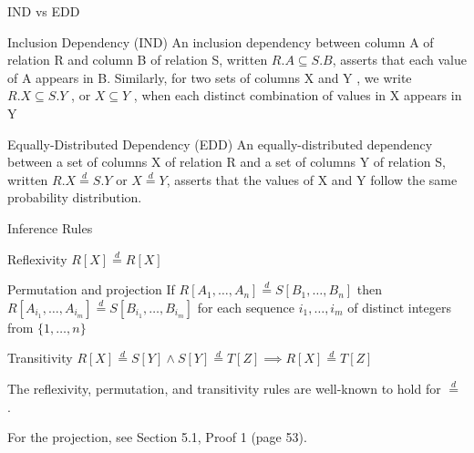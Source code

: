 \documentclass[10pt,notes]{beamer}
\newcommand{\eqdist}{\stackrel{d}{=}}
\begin{document}
\begin{frame}{IND vs EDD}
    \begin{block}{Inclusion Dependency (IND)}
        \smallskip
        An inclusion dependency between column A of relation
        R and column B of relation S, written $R.A \subseteq S.B$, asserts that each
        value of A appears in B. Similarly, for two sets of columns X
        and Y , we write $R.X \subseteq S.Y$ , or $X \subseteq Y$ , when each distinct
        combination of values in X appears in Y~\cite{abedjan2015}
    \end{block}
    \begin{block}{\alert{Equally-Distributed Dependency (EDD)}}
        \smallskip
        An equally-distributed dependency between a set of columns X
        of relation R and a set of columns Y of relation S, written $R.X \eqdist S.Y$ or
        $X \eqdist Y$, asserts that the values of X and Y follow the same probability distribution.
    \end{block}

\end{frame}

\begin{frame}{Inference Rules}
    \begin{block}{Reflexivity}
        $R[X] \eqdist R[X]$
    \end{block}
    \begin{block}{Permutation and projection}
        If $R[A_1,\dots,A_n] \eqdist S[B_1,\dots,B_n]$ then
        $R[A_{i_1},\dots,A_{i_m}] \eqdist S[B_{i_1},\dots,B_{i_m}]$ for each sequence
        $i_1,\dots,i_m$ of distinct integers from $\{1,\dots,n\}$
    \end{block}
    \begin{block}{Transitivity}
        $ R[X] \eqdist S[Y] \land S[Y] \eqdist T[Z] \implies R[X] \eqdist T[Z]$
    \end{block}
    
    \begin{block}{}
    The reflexivity, permutation, and transitivity rules are well-known to hold
    for $\eqdist$ \cite{randles1979introduction}.

    For the projection, see \alert{Section 5.1, Proof 1} (page 53).
    \end{block}
\end{frame}
\end{document}
